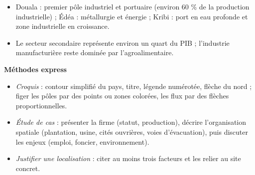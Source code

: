 \documentclass[11pt]{article}
\begin{document}
\begin{aretenir}
\begin{itemize}
\item Douala : premier pôle industriel et portuaire (environ 60 \% de la production industrielle) ; Édéa : métallurgie et énergie ; Kribi : port en eau profonde et zone industrielle en croissance.
\item Le secteur secondaire représente environ un quart du PIB ; l'industrie manufacturière reste dominée par l'agroalimentaire.
\end{itemize}

\textbf{Méthodes express}
\begin{itemize}
\item \emph{Croquis} : contour simplifié du pays, titre, légende numérotée, flèche du nord ; figer les pôles par des points ou zones colorées, les flux par des flèches proportionnelles.
\item \emph{Étude de cas} : présenter la firme (statut, production), décrire l'organisation spatiale (plantation, usine, cités ouvrières, voies d'évacuation), puis discuter les enjeux (emploi, foncier, environnement).
\item \emph{Justifier une localisation} : citer au moins trois facteurs et les relier au site concret.
\end{itemize}
\end{aretenir}
\end{document}
